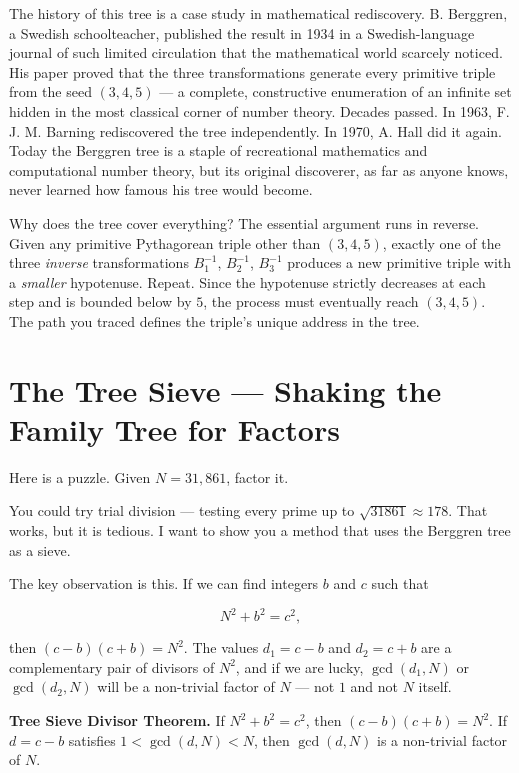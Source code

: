 \documentclass[11pt,openright,twoside]{book}
\theoremstyle{definition}
\begin{document}
The history of this tree is a case study in mathematical rediscovery. B. Berggren, a Swedish schoolteacher, published the result in 1934 in a Swedish-language journal of such limited circulation that the mathematical world scarcely noticed. His paper proved that the three transformations generate every primitive triple from the seed $(3, 4, 5)$ --- a complete, constructive enumeration of an infinite set hidden in the most classical corner of number theory. Decades passed. In 1963, F. J. M. Barning rediscovered the tree independently. In 1970, A. Hall did it again. Today the Berggren tree is a staple of recreational mathematics and computational number theory, but its original discoverer, as far as anyone knows, never learned how famous his tree would become.

Why does the tree cover everything? The essential argument runs in reverse. Given any primitive Pythagorean triple other than $(3, 4, 5)$, exactly one of the three \textit{inverse} transformations $B_1^{-1}$, $B_2^{-1}$, $B_3^{-1}$ produces a new primitive triple with a \textit{smaller} hypotenuse. Repeat. Since the hypotenuse strictly decreases at each step and is bounded below by $5$, the process must eventually reach $(3, 4, 5)$. The path you traced defines the triple's unique address in the tree.


\bigskip


\section{The Tree Sieve — Shaking the Family Tree for Factors}

Here is a puzzle. Given $N = 31{,}861$, factor it.

You could try trial division --- testing every prime up to $\sqrt{31861} \approx 178$. That works, but it is tedious. I want to show you a method that uses the Berggren tree as a sieve.

The key observation is this. If we can find integers $b$ and $c$ such that

\[N^2 + b^2 = c^2,\]

then $(c - b)(c + b) = N^2$. The values $d_1 = c - b$ and $d_2 = c + b$ are a complementary pair of divisors of $N^2$, and if we are lucky, $\gcd(d_1, N)$ or $\gcd(d_2, N)$ will be a non-trivial factor of $N$ --- not $1$ and not $N$ itself.

\textbf{Tree Sieve Divisor Theorem.} If $N^2 + b^2 = c^2$, then $(c - b)(c + b) = N^2$. If $d = c - b$ satisfies $1 < \gcd(d, N) < N$, then $\gcd(d, N)$ is a non-trivial factor of $N$.
\end{document}
